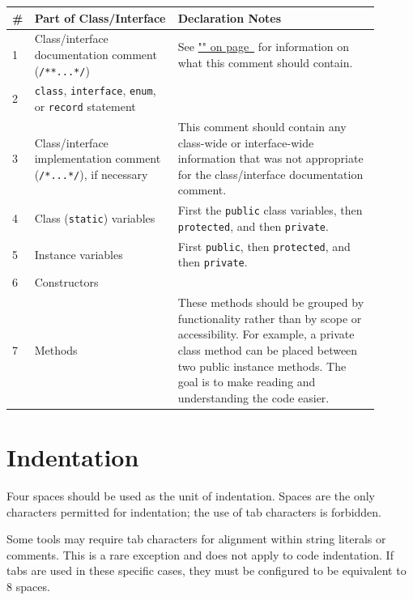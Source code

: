 \documentclass{article}
\newenvironment{note}[1]
  {\begin{notes}\item #1}{\end{notes}}
\begin{document}
\begingroup
\renewcommand{\arraystretch}{1.5}
\begin{longtable}{
  p{0.01\linewidth}|
  >{\raggedright\arraybackslash}p{0.37\linewidth}
  >{\raggedright\arraybackslash}p{0.52\linewidth}}
\hline
\# & Part of Class/Interface & Declaration Notes \\
\hline
\endhead
\hline
\endlastfoot
{1} & Class/interface documentation comment (\texttt{/**...*/}) & See
  \hyperref[doccomments]{"\nameref*{doccomments}" on page~\pageref*{doccomments}}
  for information on what this comment should contain. \\
2 & \texttt{class}, \texttt{interface}, \texttt{enum}, or \texttt{record} statement & \\
3 & Class/interface implementation comment (\texttt{/*...*/}), if necessary & This comment should
  contain any class-wide or interface-wide information that was not appropriate for the
  class/interface documentation comment. \\
4 & Class (\texttt{static}) variables & First the \texttt{public} class variables, then
  \texttt{protected}, and then \texttt{private}. \\
5 & Instance variables & First \texttt{public}, then \texttt{protected}, and then
  \texttt{private}. \\
6 & Constructors & \\
7 & Methods & These methods should be grouped by functionality rather than by scope or
  accessibility. For example, a private class method can be placed between two public instance
  methods. The goal is to make reading and understanding the code easier. \\
\end{longtable}
\endgroup

\section{Indentation}

Four spaces should be used as the unit of indentation. Spaces are the only characters permitted
for indentation; the use of tab characters is forbidden.

\begin{note}
Some tools may require tab characters for alignment within string literals or comments. This is a
rare exception and does not apply to code indentation. If tabs are used in these specific cases,
they must be configured to be equivalent to 8 spaces.
\end{note}
\end{document}
